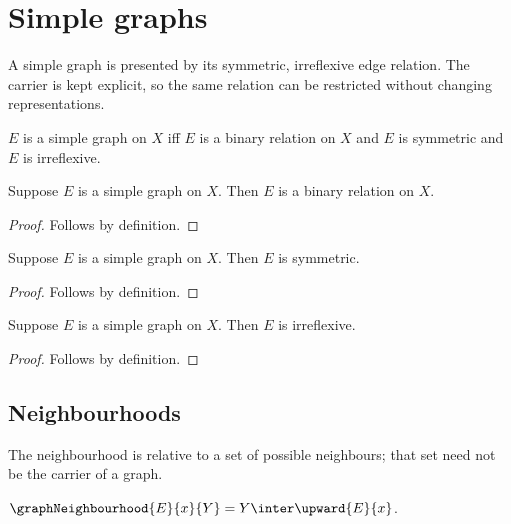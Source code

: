 \section{Simple graphs}




A simple graph is presented by its symmetric, irreflexive edge relation.  The
carrier is kept explicit, so the same relation can be restricted without
changing representations.

\begin{definition}\label{simple_graph}
    $E$ is a simple graph on $X$ iff
        $E$ is a binary relation on $X$ and
        $E$ is symmetric and
        $E$ is irreflexive.
\end{definition}

\begin{proposition}\label{simple_graph_relation}
    Suppose $E$ is a simple graph on $X$.
    Then $E$ is a binary relation on $X$.
\end{proposition}
\begin{proof}
    Follows by definition.
\end{proof}

\begin{proposition}\label{simple_graph_symmetric}
    Suppose $E$ is a simple graph on $X$.
    Then $E$ is symmetric.
\end{proposition}
\begin{proof}
    Follows by definition.
\end{proof}

\begin{proposition}\label{simple_graph_irreflexive}
    Suppose $E$ is a simple graph on $X$.
    Then $E$ is irreflexive.
\end{proposition}
\begin{proof}
    Follows by definition.
\end{proof}

\subsection{Neighbourhoods}

The neighbourhood is relative to a set of possible neighbours; that set need
not be the carrier of a graph.

\begin{definition}\label{graph_neighbourhood}
    $\graphNeighbourhood{E}{x}{Y}=Y\inter\upward{E}{x}$.
\end{definition}

